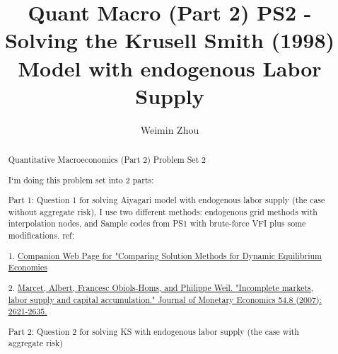 \documentclass{article}[a4paper]
\title{Quant Macro (Part 2)  PS2 - Solving the Krusell Smith (1998) Model with endogenous Labor Supply}
\author{Weimin Zhou}
\begin{document}
\maketitle
\begin{abstract}
	Quantitative Macroeconomics (Part 2) Problem Set 2

	I`m doing this problem set into 2 parts:

        Part 1: Question 1 for solving Aiyagari model with endogenous labor supply (the case without aggregate risk), I use two different methods: endogenous grid methods with interpolation nodes, and Sample codes from PS1 with brute-force VFI plus some modifications. 
        \medskip
        ref:

        1. \href{https://www.sas.upenn.edu/~jesusfv/companion.htm}{Companion Web Page for "Comparing Solution Methods for Dynamic Equilibrium Economies}

        2. \href{https://www.sciencedirect.com/science/article/pii/S0304393206002558}{Marcet, Albert, Francesc Obiols-Homs, and Philippe Weil. "Incomplete markets, labor supply and capital accumulation." Journal of Monetary Economics 54.8 (2007): 2621-2635.}

        Part 2: Question 2 for solving KS with endogenous labor supply (the case with aggregate risk)
\end{abstract}

\tableofcontents

\pagebreak 


\pagebreak
\end{document}
